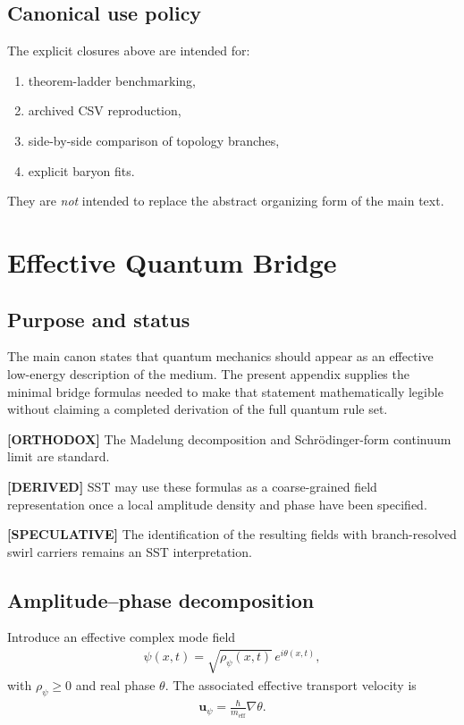 \documentclass[11pt]{article}
\theoremstyle{definition}
\theoremstyle{plain}
\theoremstyle{remark}
\begin{document}
    \subsection{Canonical use policy}
        The explicit closures above are intended for:
        \begin{enumerate}
            \item theorem-ladder benchmarking,
            \item archived CSV reproduction,
            \item side-by-side comparison of topology branches,
            \item explicit baryon fits.
        \end{enumerate}
        They are \emph{not} intended to replace the abstract organizing form of the main text.
    
    \section{Effective Quantum Bridge}
    \label{sec:appendix_quantum_bridge}
    
    \subsection{Purpose and status}
        The main canon states that quantum mechanics should appear as an effective low-energy description of the medium. The present appendix supplies the minimal bridge formulas needed to make that statement mathematically legible without claiming a completed derivation of the full quantum rule set.
        
        \textbf{[ORTHODOX]} The Madelung decomposition and Schr\"odinger-form continuum limit are standard.
        
        \textbf{[DERIVED]} SST may use these formulas as a coarse-grained field representation once a local amplitude density and phase have been specified.
        
        \textbf{[SPECULATIVE]} The identification of the resulting fields with branch-resolved swirl carriers remains an SST interpretation.
    
    \subsection{Amplitude--phase decomposition}
        Introduce an effective complex mode field
        \begin{align}
            \psi(x,t) = \sqrt{\rho_\psi(x,t)}\,e^{i\theta(x,t)},
            \label{eq:madelung_ansatz_appendix}
        \end{align}
        with \(\rho_\psi \ge 0\) and real phase \(\theta\). The associated effective transport velocity is
        \begin{align}
            \mathbf{u}_\psi
            =
            \frac{\hbar}{m_{\mathrm{eff}}}\nabla\theta.
            \label{eq:effective_phase_velocity}
        \end{align}
        
\end{document}
